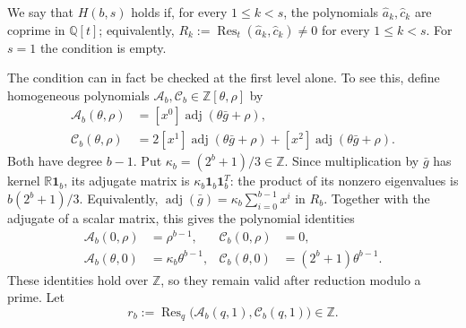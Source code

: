 \documentclass[12pt]{article}
\newcommand{\Z}{\mathbb{Z}}
\newcommand{\Q}{\mathbb{Q}}
\newcommand{\R}{\mathbb{R}}
\newcommand{\adj}{\operatorname{adj}}
\newcommand{\Res}{\operatorname{Res}}
\newcommand{\one}{\mathbf{1}}
\newcommand{\gpoly}{g}
\begin{document}
\begin{definition}\label{def:H}
We say that $H(b,s)$ holds if, for every $1\le k<s$, the polynomials
$\hat a_k,\hat c_k$ are coprime in $\Q[t]$; equivalently,
$R_k:=\Res_t(\hat a_k,\hat c_k)\ne0$ for every $1\le k<s$.
For $s=1$ the condition is empty.
\end{definition}

The condition can in fact be checked at the first level alone. To see this, define
homogeneous polynomials $\mathcal A_b,\mathcal C_b\in\Z[\theta,\rho]$ by
\begin{align*}
\mathcal A_b(\theta,\rho)
&=[x^0]\adj(\theta\bar\gpoly+\rho),\\
\mathcal C_b(\theta,\rho)
&=2[x^1]\adj(\theta\bar\gpoly+\rho)+[x^2]\adj(\theta\bar\gpoly+\rho).
\end{align*}
Both have degree $b-1$. Put $\kappa_b=(2^b+1)/3\in\Z$.
Since multiplication by $\bar\gpoly$ has kernel $\R\one_b$, its adjugate matrix is
$\kappa_b\one_b\one_b^T$: the product of its nonzero eigenvalues is
$b(2^b+1)/3$. Equivalently,
$\adj(\bar\gpoly)=\kappa_b\sum_{i=0}^{b-1}x^i$ in $R_b$.
Together with the adjugate of a scalar matrix, this gives the polynomial identities
\begin{equation}\label{eq:homogeneous-boundaries}
\begin{aligned}
\mathcal A_b(0,\rho)&=\rho^{b-1},&
\mathcal C_b(0,\rho)&=0,\\
\mathcal A_b(\theta,0)&=\kappa_b\theta^{b-1},&
\mathcal C_b(\theta,0)&=(2^b+1)\theta^{b-1}.
\end{aligned}
\end{equation}
These identities hold over $\Z$, so they remain valid after reduction modulo a prime.
Let
\begin{equation}\label{eq:base-resultant}
r_b:=\Res_q\bigl(\mathcal A_b(q,1),\mathcal C_b(q,1)\bigr)\in\Z.
\end{equation}
\end{document}
